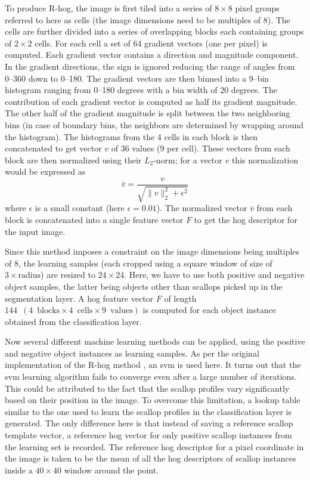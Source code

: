 \documentclass {udthesis}
\begin{document}
To produce \textsc{R-}\gls{hog}, the image is first tiled into a series of $8\times8$ pixel groups referred to here as cells (the image dimensions need to be multiples of 8). 
The cells are further divided into a series of overlapping blocks each containing groups of $2\times2$ cells. 
For each cell a set of 64 gradient vectors (one per pixel) is computed. 
Each gradient vector contains a direction and magnitude component. 
In the gradient directions, the sign is ignored reducing the range of angles from 0--360 down to 0--180. 
The gradient vectors are then binned into a 9--bin histogram ranging from 0--180 degrees with a bin width of 20 degrees. 
The contribution of each gradient vector is computed as half its gradient magnitude. 
The other half of the gradient magnitude is split between the two neighboring bins (in case of boundary bins, the neighbors are determined by wrapping around the histogram). 
The histograms from the 4 cells in each block is then concatenated to get vector $v$ of $36$ values ($9$ per cell). 
These vectors from each block are then normalized using their $L_2$-norm; for a vector $v$ this normalization would be expressed as
\[
 \bar{v}=\frac{v}{\sqrt{\|v\|^2_2+\epsilon^2}}
\]
where $\epsilon$ is a small constant (here $\epsilon=0.01$). 
The normalized vector $\bar{v}$ from each block is concatenated into a single feature vector $F$ to get the \gls{hog} descriptor for the input image. 
%

Since this method imposes a constraint on the image dimensions being multiples of 8, the learning samples (each cropped using a square window of size of $3\times \text{radius}$) are resized to $24\times24$. 
Here, we have to use both positive and negative object samples, the latter being objects other than scallops picked up in the segmentation layer. 
A \gls{hog} feature vector $F$ of length $144\enspace (4\enspace \text{blocks} \times4\enspace \text{cells} \times9\enspace \text{values})$ is computed for each object instance obtained from the classification layer.

Now several different machine learning methods can be applied, using the positive and negative object instances as learning samples. 
As per the original implementation of the \textsc{R-}\gls{hog} method \cite{dalal}, an \gls{svm} is used here. 
It turns out that the \gls{svm} learning algorithm fails to converge even after a large number of iterations. 
This could be attributed to the fact that the scallop profiles  vary significantly based on their position in the image. 
To overcome this limitation, a lookup table similar to the one used to learn the scallop profiles in the classification layer is generated. 
The only difference here is that instead of saving a reference scallop template vector, a reference \gls{hog} vector for only positive scallop instances from the learning set is recorded. 
The reference \gls{hog} descriptor for a pixel coordinate in the image is taken to be the mean of all the \gls{hog} descriptors of scallop instances inside a $40\times40$ window around the point.
\end{document}

